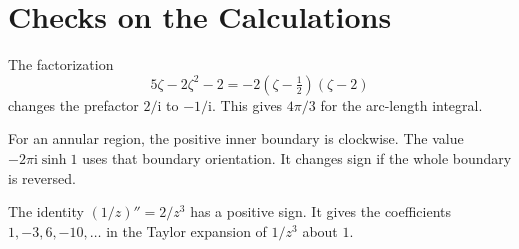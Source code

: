 \documentclass[11pt,a4paper]{article}
\theoremstyle{definition}
\theoremstyle{plain}
\begin{document}
\section{Checks on the Calculations}
The factorization
\begin{equation}\label{eq:24}
5\zeta-2\zeta^2-2=-2(\zeta-\tfrac12)(\zeta-2)
\end{equation}
changes the prefactor $2/\mathrm{i}$ to $-1/\mathrm{i}$. This gives
$4\pi/3$ for the arc-length integral.

For an annular region, the positive inner boundary is clockwise. The
value $-2\pi\mathrm{i}\sinh1$ uses that boundary orientation. It changes
sign if the whole boundary is reversed.

The identity $(1/z)''=2/z^3$ has a positive sign. It gives the coefficients
$1,-3,6,-10,\ldots$ in the Taylor expansion of $1/z^3$ about $1$.
\end{document}
